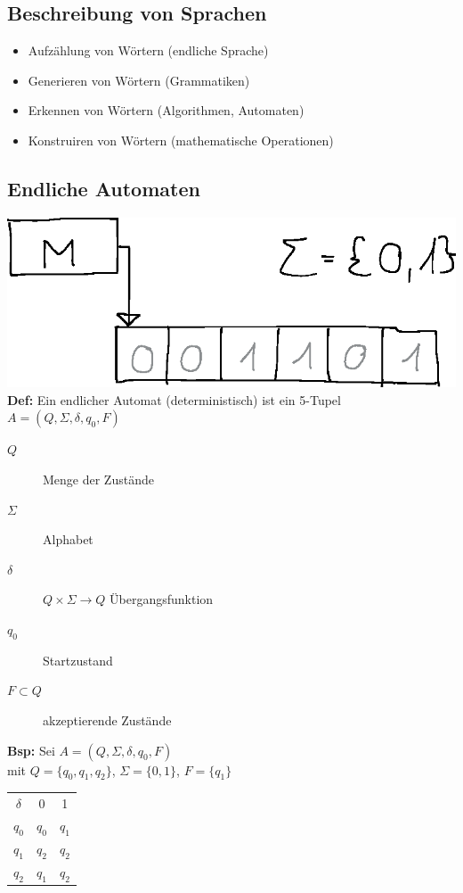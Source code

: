 \documentclass[10pt]{article}
\newcommand{\Bold}[1]{\textbf{#1}} %
\begin{document}
\subsection{Beschreibung von Sprachen}
\begin{itemize}
 \item Aufz\"ahlung von W\"ortern (endliche Sprache)
 \item Generieren von W\"ortern (Grammatiken)
 \item Erkennen von W\"ortern (Algorithmen, Automaten)
 \item Konstruiren von W\"ortern (mathematische Operationen)
\end{itemize}
\subsection{Endliche Automaten}
\includegraphics{Bild1.eps}\\
\Bold{Def:} Ein endlicher Automat (deterministisch) ist ein 5-Tupel $A=(Q,\Sigma,\delta,q_0,F)$
\begin{description}
 \item [$Q$] Menge der Zust\"ande
 \item [$\Sigma$] Alphabet
 \item [$\delta$] $Q\times\Sigma\to Q$ \"Ubergangsfunktion
 \item [$q_0$] Startzustand
 \item [$F\subset Q$] akzeptierende Zust\"ande
\end{description}
\Bold{Bsp:} Sei $A=(Q,\Sigma,\delta,q_0,F)$\\
mit $Q=\{q_0,q_1,q_2\}$, $\Sigma=\{0,1\}$, $F=\{q_1\}$\\
\begin{tabular}{c|c|c}
 $\delta$&0&1\\
 $q_0$&$q_0$&$q_1$\\
 $q_1$&$q_2$&$q_2$\\
 $q_2$&$q_1$&$q_2$\\
\end{tabular}\\
\end{document}
